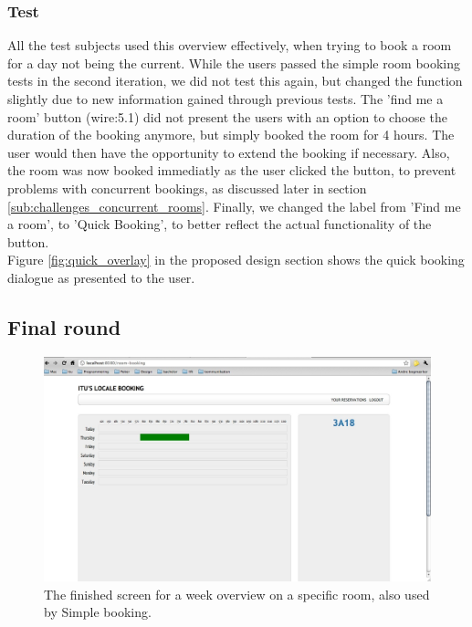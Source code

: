 \subsubsection{Test}
All the test subjects used this overview effectively, when trying to book a room for a day not being the current. While the users passed the simple room booking tests in the second iteration, we did not test this again, but changed the function slightly due to new information gained through previous tests. The 'find me a room' button (wire:5.1) did not present the users with an option to choose the duration of the booking anymore, but simply booked the room for 4 hours. The user would then have the opportunity to extend the booking if necessary. Also, the room was now booked immediatly as the user clicked the button, to prevent problems with concurrent bookings, as discussed later in section \ref{sub:challenges_concurrent_rooms}. Finally, we changed the label from 'Find me a room', to 'Quick Booking', to better reflect the actual functionality of the button.\\
Figure \ref{fig:quick_overlay} in the proposed design section shows the quick booking dialogue as presented to the user.


\pagebreak
\subsection{Final round}
\begin{figure}[htb]
\begin{center}
\leavevmode
\includegraphics[width=1\textwidth]{images/weekFinal}
\end{center}
\caption{The finished screen for a week overview on a specific room, also used by Simple booking.}
\label{fig:week_final}
\end{figure}

